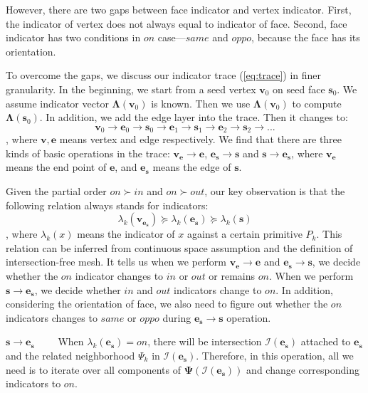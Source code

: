 \documentclass[10pt,journal,compsoc]{IEEEtran}
\begin{document}
However, there are two gaps between face indicator and vertex indicator. First, the indicator of vertex does not always equal to indicator of face. Second, face indicator has two conditions in $on$ case---$same$ and $oppo$, because the face has its orientation.

To overcome the gaps, we discuss our indicator trace (\ref{eq:trace}) in finer granularity. In the beginning, we start from a seed vertex $\bm{v}_0$ on seed face $\bm{s}_0$. We assume indicator vector $\bm{\Lambda}(\bm{v}_0)$ is known. Then we use $\bm{\Lambda}(\bm{v}_0)$ to compute $\bm{\Lambda}(\bm{s}_0)$. In addition, we add the edge layer into the trace. Then it changes to:
\begin{equation}
\bm{v}_0\to \bm{e}_0\to \bm{s}_0\to \bm{e}_1\to \bm{s}_1\to \bm{e}_2\to \bm{s}_2\to ...
\end{equation}
, where $\bm{v}, \bm{e}$ means vertex and edge respectively. We find that there are three kinds of basic operations in the trace: $\bm{v}_{\bm{e}}\to \bm{e}$, $\bm{e}_{\bm{s}}\to \bm{s}$ and $\bm{s}\to \bm{e}_{\bm{s}}$, where $\bm{v}_{\bm{e}}$ means the end point of $\bm{e}$, and $\bm{e}_{\bm{s}}$ means the edge of $\bm{s}$.

Given the partial order $on \succ in$ and $on \succ out$, our key observation is that the following relation always stands for indicators:
\begin{equation}
\label{eq:porder}
\lambda_k(\bm{v}_{\bm{e}_{\bm{s}}}) \succeq \lambda_k(\bm{e}_{\bm{s}}) \succeq \lambda_k(\bm{s})
\end{equation}
, where $\lambda_k(x)$ means the indicator of $x$ against a certain primitive $P_k$. This relation can be inferred from continuous space assumption and the definition of intersection-free mesh. It tells us when we perform $\bm{v}_{\bm{e}}\to \bm{e}$ and $\bm{e}_{\bm{s}}\to \bm{s}$, we decide whether the $on$ indicator changes to $in$ or $out$ or remains $on$. When we perform $\bm{s}\to \bm{e}_{\bm{s}}$, we decide whether $in$ and $out$ indicators change to $on$. In addition, considering the orientation of face, we also need to figure out whether the $on$ indicators changes to $same$ or $oppo$ during $\bm{e}_{\bm{s}}\to \bm{s}$ operation.

\vspace{0.5em}
\noindent\textbf{$\bm{s\to \bm{e}_{\bm{s}}}$}~~~~ When $\lambda_k(\bm{e}_{\bm{s}})=on$, there will be intersection $\bm{\mathcal{I}}(\bm{e}_{\bm{s}})$ attached to $\bm{e}_{\bm{s}}$ and the related neighborhood $\Psi_k$ in $\bm{\mathcal{I}}(\bm{e}_{\bm{s}})$. Therefore, in this operation, all we need is to iterate over all components of $\bm{\Psi}(\bm{\mathcal{I}}(\bm{e}_{\bm{s}}))$ and change corresponding indicators to $on$.
\end{document}

